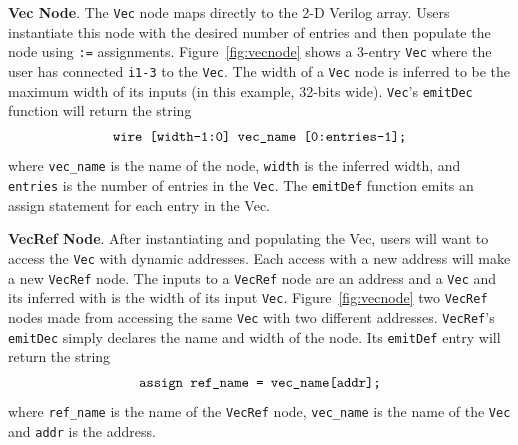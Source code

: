 \textbf{Vec Node}. The {\tt Vec} node maps directly to the 2-D Verilog
array. Users instantiate this node with the desired number of entries
and then populate the node using {\tt :=}
assignments. Figure~\ref{fig:vecnode} shows a 3-entry {\tt Vec} where
the user has connected {\tt i1-3} to the {\tt Vec}. The width of a
{\tt Vec} node is inferred to be the maximum width of its inputs (in
this example, 32-bits wide). {\tt Vec}'s {\tt emitDec} function will
return the string
\begin{align*}
\centering
\text{\tt{wire [width-1:0] vec\_name [0:entries-1];}}
\end{align*}
where {\tt vec\_name} is the name of the node, {\tt width} is the
inferred width, and {\tt entries} is the number of entries in the
{\tt Vec}. The {\tt emitDef} function emits an assign statement for
each entry in the Vec.

\textbf{VecRef Node}. After instantiating and populating the Vec,
users will want to access the {\tt Vec} with dynamic addresses. Each
access with a new address will make a new {\tt VecRef} node. The
inputs to a {\tt VecRef} node are an address and a 
{\tt Vec} and its inferred with is the width of its input
{\tt Vec}. Figure~\ref{fig:vecnode} two {\tt VecRef} nodes made from
accessing the same {\tt Vec} with two different addresses. 
{\tt VecRef}'s {\tt emitDec} simply declares the name and width of the
node. Its {\tt emitDef} entry will return the string
\begin{align*}
\centering
\text{\tt{assign ref\_name = vec\_name[addr];}}
\end{align*}
where {\tt ref\_name} is the name of the {\tt VecRef} node, 
{\tt vec\_name} is the name of the {\tt Vec} and {\tt addr} is the
address.
